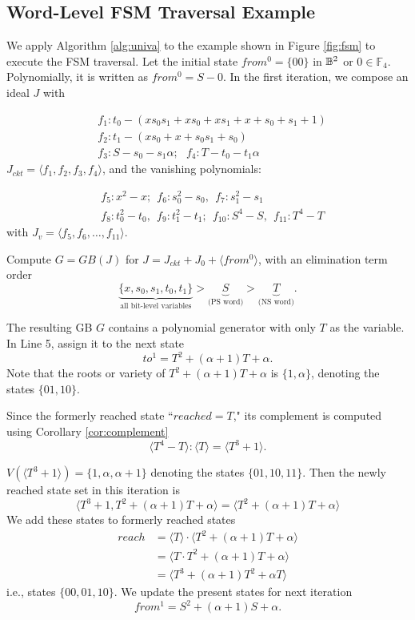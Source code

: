 \subsection{Word-Level FSM Traversal Example}
\begin{Example}
\label{ex:SMPO}
We apply Algorithm \ref{alg:univa} to the example shown in
Figure \ref{fig:fsm} to execute the FSM traversal. Let the initial state
$from^0 = \{00\}$ in ${\mathbb{B}}^2$ or $0 \in \mathbb F_4$. Polynomially, it is
written as $from^0 = S - 0$. In the first iteration, we compose
an ideal $J$ with 

\begin{align*}
&f_1: t_0- (xs_0s_1+xs_0+xs_1+x+s_0+s_1+1)\\
&f_2: t_1 - (xs_0+x+s_0s_1+s_0)\\
&f_3: S - s_0 - s_1\alpha; ~~~f_4: T - t_0 - t_1\alpha
\end{align*}
$J_{ckt} = \langle f_1,f_2,f_3,f_4\rangle$, and the vanishing
polynomials: 

\begin{align*}
&f_5: x^2-x; ~~f_6: s_0^2-s_0, ~~f_7: s_1^2-s_1\\
&f_8: t_0^2-t_0, ~~f_9: t_1^2-t_1; ~~f_{10}: S^4-S, ~~f_{11}:T^4-T
\end{align*}
with $J_v = \langle f_5,f_6,\dots,f_{11}\rangle$.


Compute $G = GB(J)$ for $J = J_{ckt}+J_0+\langle from^0\rangle$,
with an elimination term order 
$$ \underbrace{\{x,s_0,s_1,t_0,t_1\}}_{\text{all bit-level variables}} 
> \underbrace{S}_{\text{(PS~word)}} > \underbrace{T}_{\text{(NS~word)}}.$$

The resulting GB $G$ contains a polynomial generator with only $T$ as
the variable. In Line 5, assign it to the next state $$to^1 =
T^2+(\alpha+1)T+\alpha.$$ Note that the roots or variety of
$T^2+(\alpha+1)T+\alpha$ is $\{1, \alpha\}$, denoting the states
$\{01,10\}$. 

Since the formerly reached state ``$reached = T$," its complement is
computed using Corollary \ref{cor:complement} 
$$\langle T^4-T\rangle:\langle T\rangle
= \langle T^3+1\rangle.$$ 

$V(\langle T^3 + 1\rangle) = \{1, \alpha, \alpha+1\}$ denoting the states
$\{01,10,11\}$. Then the newly reached state set in this iteration is 
$$\langle T^3+1, T^2+(\alpha+1)T+\alpha \rangle = \langle
T^2+(\alpha+1)T+\alpha \rangle$$ We add these states 
to formerly reached states 
\begin{align*}
reach &= \langle T\rangle \cdot \langle T^2+(\alpha+1)T+\alpha \rangle \\
&= \langle T\cdot T^2+(\alpha+1)T+\alpha \rangle \\
&= \langle T^3+(\alpha+1)T^2+\alpha T\rangle
\end{align*}
i.e., states $\{00,01,10\}$. We update the present states
for next iteration $$from^1 = S^2+(\alpha+1)S+\alpha.$$ 


\end{Example}

